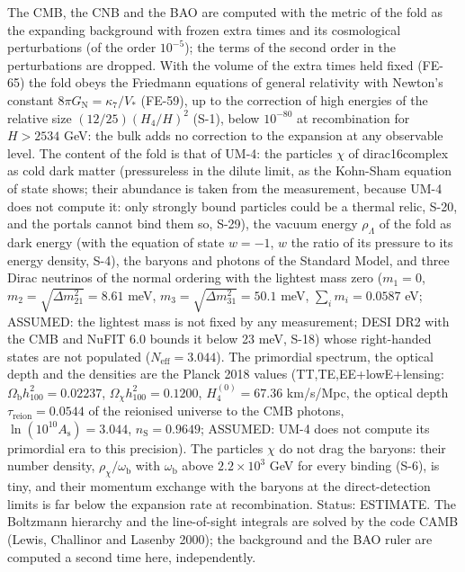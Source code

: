 \documentclass[
  10pt,
]{article}
\begin{document}
The CMB, the CNB and the BAO are computed with the metric of the fold as
the expanding background with frozen extra times and its cosmological
perturbations (of the order \(10^{-5}\)); the terms of the second order
in the perturbations are dropped. With the volume of the extra times
held fixed (FE-65) the fold obeys the Friedmann equations of general
relativity with Newton's constant \(8\pi G_{\mathrm{N}} = \kappa_7/V_*\)
(FE-59), up to the correction of high energies of the relative size
\((12/25)(H_4/H)^2\) (S-1), below \(10^{-80}\) at recombination for
\(H > 2534\) GeV: the bulk adds no correction to the expansion at any
observable level. The content of the fold is that of UM-4: the particles
\(\chi\) of dirac16complex as cold dark matter (pressureless in the
dilute limit, as the Kohn-Sham equation of state shows; their abundance
is taken from the measurement, because UM-4 does not compute it: only
strongly bound particles could be a thermal relic, S-20, and the portals
cannot bind them so, S-29), the vacuum energy \(\rho_\Lambda\) of the
fold as dark energy (with the equation of state \(w = -1\), \(w\) the
ratio of its pressure to its energy density, S-4), the baryons and
photons of the Standard Model, and three Dirac neutrinos of the normal
ordering with the lightest mass zero (\(m_1 = 0\),
\(m_2 = \sqrt{\Delta m^2_{21}} = 8.61\) meV,
\(m_3 = \sqrt{\Delta m^2_{31}} = 50.1\) meV, \(\sum_im_i = 0.0587\) eV;
ASSUMED: the lightest mass is not fixed by any measurement; DESI DR2
with the CMB and NuFIT 6.0 bounds it below 23 meV, S-18) whose
right-handed states are not populated (\(N_{\mathrm{eff}} = 3.044\)).
The primordial spectrum, the optical depth and the densities are the
Planck 2018 values (TT,TE,EE+lowE+lensing:
\(\Omega_{\mathrm{b}}h_{100}^2 = 0.02237\),
\(\Omega_\chi h_{100}^2 = 0.1200\), \(H_4^{(0)} = 67.36\) km/s/Mpc, the
optical depth \(\tau_{\mathrm{reion}} = 0.0544\) of the reionised
universe to the CMB photons, \(\ln(10^{10}A_{\mathrm{s}}) = 3.044\),
\(n_{\mathrm{S}} = 0.9649\); ASSUMED: UM-4 does not compute its
primordial era to this precision). The particles \(\chi\) do not drag
the baryons: their number density, \(\rho_\chi/\omega_{\mathrm{b}}\)
with \(\omega_{\mathrm{b}}\) above \(2.2\times10^3\) GeV for every
binding (S-6), is tiny, and their momentum exchange with the baryons at
the direct-detection limits is far below the expansion rate at
recombination. Status: ESTIMATE. The Boltzmann hierarchy and the
line-of-sight integrals are solved by the code CAMB (Lewis, Challinor
and Lasenby 2000); the background and the BAO ruler are computed a
second time here, independently.
\end{document}
